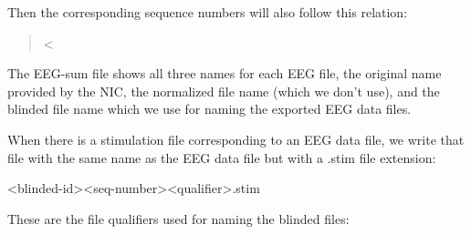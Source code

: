 \documentclass[letterpaper,10pt,english]{sphinxmanual}
\begin{document}
Then the corresponding sequence numbers will also follow this relation:
\begin{quote}

 \textless{} 
\end{quote}

The EEG-sum file shows all three names for each EEG file, the original
name provided by the NIC, the normalized file name (which we don’t use),
and the blinded file name which we use for naming the exported EEG data
files.

When there is a stimulation file corresponding to an EEG data file, we
write that file with the same name as the EEG data file but with a .stim
file extension:

\textless{}blinded-id\textgreater{}\textless{}seq-number\textgreater{}\textless{}qualifier\textgreater{}.stim

These are the file qualifiers used for naming the blinded files:
\end{document}
